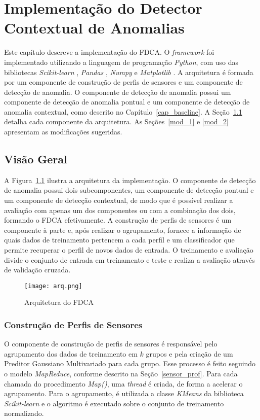 \documentclass[cic,tc]{iiufrgs}
\begin{document}
\chapter{Implementação do Detector Contextual de Anomalias}
\label{implementacao}
Este capítulo descreve a implementação do FDCA. O \textit{framework} foi implementado utilizando a linguagem de programação \textit{Python}, com uso das bibliotecas \textit{Scikit-learn} \cite{scikit-learn}, \textit{Pandas} \cite{mckinney-proc-scipy-2010}, \textit{Numpy} \cite{walt2011numpy} e \textit{Matplotlib} \cite{hunter2007matplotlib}. A arquitetura é formada por um componente de construção de perfis de sensores e um componente de detecção de anomalia. O componente de detecção de anomalia possui um componente de detecção de anomalia pontual e um componente de detecção de anomalia contextual, como descrito no Capítulo~\ref{cap_baseline}. A Seção~\ref{imp_vis_geral} detalha cada componente da arquitetura. As Seções~\ref{mod_1} e \ref{mod_2} apresentam as modificações sugeridas.

\section{Visão Geral}
\label{imp_vis_geral}
A Figura~\ref{imp_arq} ilustra a arquitetura da implementação. O componente de detecção de anomalia possui dois subcomponentes, um componente de detecção pontual e um componente de detecção contextual, de modo que é possível realizar a avaliação com apenas um dos componentes ou com a combinação dos dois, formando o FDCA efetivamente. A construção de perfis de sensores é um componente à parte e, após realizar o agrupamento, fornece a informação de quais dados de treinamento pertencem a cada perfil e um classificador que permite recuperar o perfil de novos dados de entrada. O treinamento e avaliação divide o conjunto de entrada em treinamento e teste e realiza a avaliação através de validação cruzada.

\begin{figure}
	\caption{Arquitetura do FDCA}
	\bigskip
		\begin{center}
			\texttt{[image: arq.png]}
		\end{center}
	\label{imp_arq}
\end{figure}

\subsection{Construção de Perfis de Sensores}
\label{construcao_sp}
O componente de construção de perfis de sensores é responsável pelo agrupamento dos dados de treinamento em $k$ grupos e pela criação de um Preditor Gaussiano Multivariado para cada grupo. Esse processo é feito seguindo o modelo \textit{MapReduce}, conforme descrito na Seção~\ref{sensor_prof}. Para cada chamada do procedimento \textit{Map()}, uma \textit{thread} é criada, de forma a acelerar o agrupamento. Para o agrupamento, é utilizada a classe \textit{KMeans} da biblioteca \textit{Scikit-learn} e o algoritmo é executado sobre o conjunto de treinamento normalizado.
\end{document}
